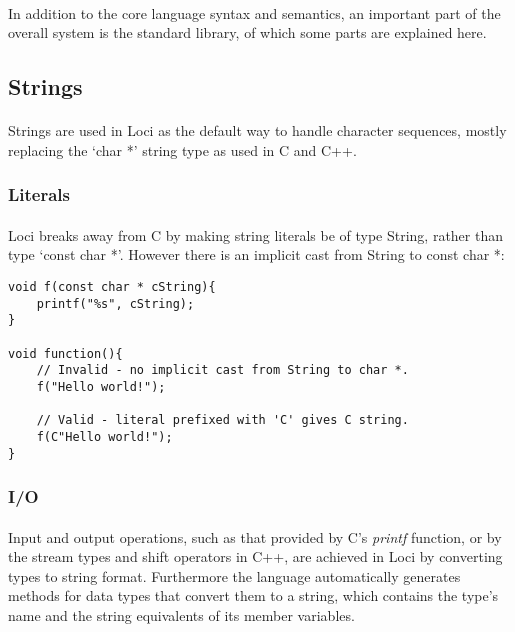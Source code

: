 \documentclass[12pt,twoside,notitlepage]{report}
\begin{document}
\paragraph{}
In addition to the core language syntax and semantics, an important part of the overall system is the standard library, of which some parts are explained here.

\subsection{Strings}

\paragraph{}
Strings are used in Loci as the default way to handle character sequences, mostly replacing the `char *' string type as used in C and C++.

\subsubsection{Literals}

\paragraph{}
Loci breaks away from C by making string literals be of type String, rather than type `const char *'. However there is an implicit cast from String to const char *:


\begin{lstlisting}
void f(const char * cString){
	printf("%s", cString);
}

void function(){
	// Invalid - no implicit cast from String to char *.
	f("Hello world!");
	
	// Valid - literal prefixed with 'C' gives C string.
	f(C"Hello world!");
}
\end{lstlisting}


\subsubsection{I/O}

\paragraph{}
Input and output operations, such as that provided by C's \emph{printf} function, or by the stream types and shift operators in C++, are achieved in Loci by converting types to string format. Furthermore the language automatically generates methods for data types that convert them to a string, which contains the type's name and the string equivalents of its member variables.
\end{document}
